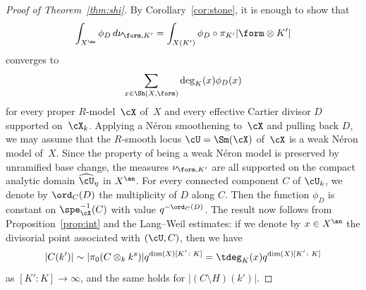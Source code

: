 \begin{proof}[Proof of Theorem~\ref{thm:shi}]
By Corollary~\ref{cor:stone}, it is enough to show that
\[
\int_{X^{\an}}\phi_D\, d\nu_{\form,K'}=\int_{X(K')}\phi_D\circ \pi_{K'}|\form\otimes K'|
\]
converges to
\[
\sum_{x\in \Sh(X,\form)}\deg_K(x)\phi_D(x)
\]
for
every proper $R$\nobreakdash-model~$\cX$ of~$X$ and every effective Cartier divisor $D$ supported on~$\cX_k$.
Applying a Néron smoothening to~$\cX$ and pulling back $D$, we may assume that the $R$\nobreakdash-smooth locus $\cU=\Sm(\cX)$ of~$\cX$ is a weak Néron model of~$X$.
Since the property of being a weak Néron model is preserved by unramified base change, the measures $\nu_{\form,K'}$ are all supported on the compact analytic domain $\widehat{\cU}_{\eta}$ in $X^{\an}$. For every connected component $C$ of $\cU_k$, we denote by $\ord_C(D)$ the multiplicity of $D$ along $C$. Then
the function $\phi_D$ is constant on $\spe_{\cX}^{-1}(C)$ with value $q^{-\ord_C(D)}$. The result now follows from Proposition~\ref{prop:int} and the Lang--Weil estimates:
if we denote by $x\in X^{\an}$ the divisorial point associated with $(\cU,C)$, then
we have
\begin{equation*}
|C(k')|
\sim |\pi_0(C\otimes_k k^s)|q^{\dim(X)[K'\colon K]}
= \tdeg_K(x)q^{\dim(X)[K'\colon K]}
\end{equation*}
as $[K':K]\to\infty$, and the same holds for $|(C\setminus H)(k')|$.
\end{proof}

